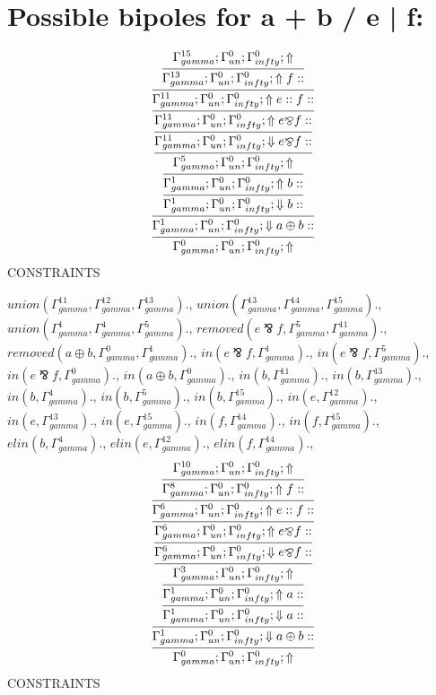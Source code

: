 \documentclass[a4paper, 11pt]{article}
\begin{document}
\section{Possible bipoles for a + b / e | f:} 

\[
\infer{\Gamma_{ gamma}^{0} ; \Gamma_{un}^{0} ; \Gamma_{ infty}^{0} ;  \Uparrow }
{\infer{\Gamma_{ gamma}^{1} ; \Gamma_{un}^{0} ; \Gamma_{ infty}^{0} ;  \Downarrow a \oplus b :: }
{\infer{\Gamma_{ gamma}^{1} ; \Gamma_{un}^{0} ; \Gamma_{ infty}^{0} ;  \Downarrow b :: }
{\infer{\Gamma_{ gamma}^{1} ; \Gamma_{un}^{0} ; \Gamma_{ infty}^{0} ;  \Uparrow b :: }
{\infer{\Gamma_{ gamma}^{5} ; \Gamma_{un}^{0} ; \Gamma_{ infty}^{0} ;  \Uparrow }
{\infer{\Gamma_{ gamma}^{11} ; \Gamma_{un}^{0} ; \Gamma_{ infty}^{0} ;  \Downarrow e \bindnasrepma f :: }
{\infer{\Gamma_{ gamma}^{11} ; \Gamma_{un}^{0} ; \Gamma_{ infty}^{0} ;  \Uparrow e \bindnasrepma f :: }
{\infer{\Gamma_{ gamma}^{11} ; \Gamma_{un}^{0} ; \Gamma_{ infty}^{0} ;  \Uparrow e :: f :: }
{\infer{\Gamma_{ gamma}^{13} ; \Gamma_{un}^{0} ; \Gamma_{ infty}^{0} ;  \Uparrow f :: }
{\Gamma_{ gamma}^{15} ; \Gamma_{un}^{0} ; \Gamma_{ infty}^{0} ;  \Uparrow }}}}}}}}}
\]
CONSTRAINTS

$union(\Gamma_{gamma}^{11}, \Gamma_{gamma}^{12}, \Gamma_{gamma}^{13}).$, $union(\Gamma_{gamma}^{13}, \Gamma_{gamma}^{14}, \Gamma_{gamma}^{15}).$, $union(\Gamma_{gamma}^{1}, \Gamma_{gamma}^{4}, \Gamma_{gamma}^{5}).$, $removed(e \bindnasrepma f, \Gamma_{gamma}^{5}, \Gamma_{gamma}^{11}).$, $removed(a \oplus b, \Gamma_{gamma}^{0}, \Gamma_{gamma}^{1}).$, $in(e \bindnasrepma f, \Gamma_{gamma}^{1}).$, $in(e \bindnasrepma f, \Gamma_{gamma}^{5}).$, $in(e \bindnasrepma f, \Gamma_{gamma}^{0}).$, $in(a \oplus b, \Gamma_{gamma}^{0}).$, $in(b, \Gamma_{gamma}^{11}).$, $in(b, \Gamma_{gamma}^{13}).$, $in(b, \Gamma_{gamma}^{4}).$, $in(b, \Gamma_{gamma}^{5}).$, $in(b, \Gamma_{gamma}^{15}).$, $in(e, \Gamma_{gamma}^{12}).$, $in(e, \Gamma_{gamma}^{13}).$, $in(e, \Gamma_{gamma}^{15}).$, $in(f, \Gamma_{gamma}^{14}).$, $in(f, \Gamma_{gamma}^{15}).$, $elin(b, \Gamma_{gamma}^{4}).$, $elin(e, \Gamma_{gamma}^{12}).$, $elin(f, \Gamma_{gamma}^{14}).$, 
\[
\infer{\Gamma_{ gamma}^{0} ; \Gamma_{un}^{0} ; \Gamma_{ infty}^{0} ;  \Uparrow }
{\infer{\Gamma_{ gamma}^{1} ; \Gamma_{un}^{0} ; \Gamma_{ infty}^{0} ;  \Downarrow a \oplus b :: }
{\infer{\Gamma_{ gamma}^{1} ; \Gamma_{un}^{0} ; \Gamma_{ infty}^{0} ;  \Downarrow a :: }
{\infer{\Gamma_{ gamma}^{1} ; \Gamma_{un}^{0} ; \Gamma_{ infty}^{0} ;  \Uparrow a :: }
{\infer{\Gamma_{ gamma}^{3} ; \Gamma_{un}^{0} ; \Gamma_{ infty}^{0} ;  \Uparrow }
{\infer{\Gamma_{ gamma}^{6} ; \Gamma_{un}^{0} ; \Gamma_{ infty}^{0} ;  \Downarrow e \bindnasrepma f :: }
{\infer{\Gamma_{ gamma}^{6} ; \Gamma_{un}^{0} ; \Gamma_{ infty}^{0} ;  \Uparrow e \bindnasrepma f :: }
{\infer{\Gamma_{ gamma}^{6} ; \Gamma_{un}^{0} ; \Gamma_{ infty}^{0} ;  \Uparrow e :: f :: }
{\infer{\Gamma_{ gamma}^{8} ; \Gamma_{un}^{0} ; \Gamma_{ infty}^{0} ;  \Uparrow f :: }
{\Gamma_{ gamma}^{10} ; \Gamma_{un}^{0} ; \Gamma_{ infty}^{0} ;  \Uparrow }}}}}}}}}
\]
CONSTRAINTS
\end{document}

